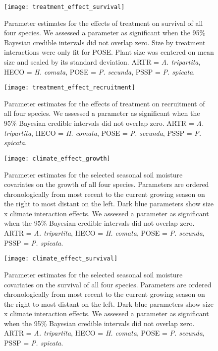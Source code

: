 \documentclass[11pt]{article}
\begin{document}
\begin{figure}[!htbp]
	\centering
	\texttt{[image: treatment\_effect\_survival]}
	\caption{Parameter estimates for the effects of treatment on survival of all four species. We assessed a parameter as significant when the 95\% Bayesian credible intervals did not overlap zero. Size by treatment interactions were only fit for POSE. Plant size was centered on mean size and scaled by its standard deviation.  ARTR = \textit{A. tripartita}, HECO = \textit{H. comata}, POSE = \textit{P. secunda}, PSSP = \textit{P. spicata}. }
	\label{fig:survivalTreat}
\end{figure}

\begin{figure}[!htbp]
	\centering
	\texttt{[image: treatment\_effect\_recruitment]}
	\caption{Parameter estimates for the effects of treatment on recruitment of all four species. We assessed a parameter as significant when the 95\% Bayesian credible intervals did not overlap zero.  ARTR = \textit{A. tripartita}, HECO = \textit{H. comata}, POSE = \textit{P. secunda}, PSSP = \textit{P. spicata}. }
	\label{fig:recruitmentTreat}
\end{figure}

\begin{figure}[!htbp]
	\centering
	\texttt{[image: climate\_effect\_growth]}
	\caption{Parameter estimates for the selected seasonal soil moisture covariates on the growth of all four species. Parameters are ordered chronologically from most recent to the current growing season on the right to most distant on the left. Dark blue parameters show size x climate interaction effects. We assessed a parameter as significant when the 95\% Bayesian credible intervals did not overlap zero.  ARTR = \textit{A. tripartita}, HECO = \textit{H. comata}, POSE = \textit{P. secunda}, PSSP = \textit{P. spicata}. }
	\label{fig:climateGrowth}
\end{figure}

\begin{figure}[!htbp]
	\centering
	\texttt{[image: climate\_effect\_survival]}
	\caption{Parameter estimates for the selected seasonal soil moisture covariates on the survival of all four species. Parameters are ordered chronologically from most recent to the current growing season on the right to most distant on the left. Dark blue parameters show size x climate interaction effects. We assessed a parameter as significant when the 95\% Bayesian credible intervals did not overlap zero.  ARTR = \textit{A. tripartita}, HECO = \textit{H. comata}, POSE = \textit{P. secunda}, PSSP = \textit{P. spicata}. }
	\label{fig:climateSurvival}
\end{figure}
\end{document}
